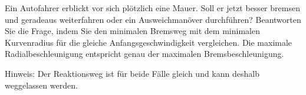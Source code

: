 Ein Autofahrer erblickt vor sich plötzlich eine Mauer. Soll er jetzt besser bremsen und geradeaus weiterfahren oder ein Ausweichmanöver durchführen? Beantworten Sie die Frage, indem Sie den minimalen Bremsweg mit dem minimalen Kurvenradius für die gleiche Anfangsgeschwindigkeit vergleichen. Die maximale Radialbeschleunigung entspricht genau der maximalen Bremsbeschleunigung.

Hinweis: Der Reaktionsweg ist für beide Fälle gleich und kann deshalb weggelassen werden.
